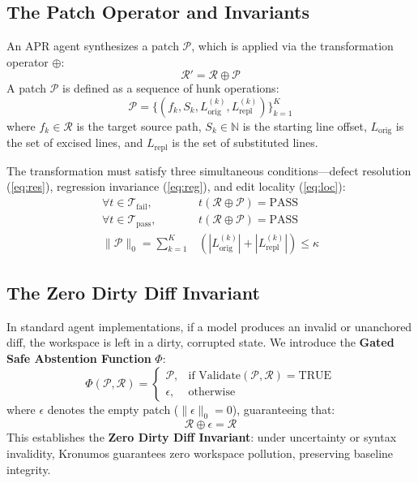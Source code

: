 \documentclass[10pt,twocolumn,letterpaper]{article}
\begin{document}
\subsection{The Patch Operator and Invariants}
An APR agent synthesizes a patch $\mathcal{P}$, which is applied via the transformation operator $\oplus$:
\begin{equation}
    \mathcal{R}' = \mathcal{R} \oplus \mathcal{P}
\end{equation}
A patch $\mathcal{P}$ is defined as a sequence of hunk operations:
\begin{equation}
    \mathcal{P} = \{ (f_k, S_k, L_{\text{orig}}^{(k)}, L_{\text{repl}}^{(k)}) \}_{k=1}^K
\end{equation}
where $f_k \in \mathcal{R}$ is the target source path, $S_k \in \mathbb{N}$ is the starting line offset, $L_{\text{orig}}$ is the set of excised lines, and $L_{\text{repl}}$ is the set of substituted lines.

The transformation must satisfy three simultaneous conditions---defect resolution (\ref{eq:res}), regression invariance (\ref{eq:reg}), and edit locality (\ref{eq:loc}):
\begin{align}
    \forall t \in \mathcal{T}_{\text{fail}}, \quad &t(\mathcal{R} \oplus \mathcal{P}) = \text{PASS} \label{eq:res} \\
    \forall t \in \mathcal{T}_{\text{pass}}, \quad &t(\mathcal{R} \oplus \mathcal{P}) = \text{PASS} \label{eq:reg} \\
    \|\mathcal{P}\|_0 = \sum_{k=1}^K &(|L_{\text{orig}}^{(k)}| + |L_{\text{repl}}^{(k)}|) \le \kappa \label{eq:loc}
\end{align}

\subsection{The Zero Dirty Diff Invariant}
In standard agent implementations, if a model produces an invalid or unanchored diff, the workspace is left in a dirty, corrupted state. We introduce the \textbf{Gated Safe Abstention Function} $\Phi$:
\begin{equation}
    \Phi(\mathcal{P}, \mathcal{R}) = \begin{cases}
    \mathcal{P}, & \text{if } \text{Validate}(\mathcal{P}, \mathcal{R}) = \text{TRUE} \\
    \epsilon, & \text{otherwise}
    \end{cases}
\end{equation}
where $\epsilon$ denotes the empty patch ($\|\epsilon\|_0 = 0$), guaranteeing that:
\begin{equation}
    \mathcal{R} \oplus \epsilon = \mathcal{R}
\end{equation}
This establishes the \textbf{Zero Dirty Diff Invariant}: under uncertainty or syntax invalidity, Kronumos guarantees zero workspace pollution, preserving baseline integrity.
\end{document}
